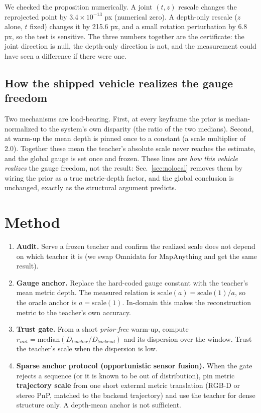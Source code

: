 We checked the proposition numerically. A joint $(t,z)$ rescale changes the
reprojected point by $3.4\times10^{-13}$ px (numerical zero). A depth-only rescale
($z$ alone, $t$ fixed) changes it by 215.6 px, and a small rotation perturbation
by 6.8 px, so the test is sensitive. The three numbers together are the
certificate: the joint direction is null, the depth-only direction is not, and
the measurement could have seen a difference if there were one.

\subsection{How the shipped vehicle realizes the gauge freedom}

Two mechanisms are load-bearing. First, at every keyframe the prior is
median-normalized to the system's own disparity (the ratio of the two medians).
Second, at warm-up the mean depth is pinned once to a constant (a scale
multiplier of 2.0). Together these mean the teacher's absolute scale never reaches the estimate, and
the global gauge is set once and frozen. These lines are \emph{how this vehicle
realizes} the gauge freedom, not the result: Sec.~\ref{sec:nolocal} removes them by wiring the
prior as a true metric-depth factor, and the global conclusion is unchanged,
exactly as the structural argument predicts.

\section{Method}

\begin{enumerate}
\item \textbf{Audit.} Serve a frozen teacher and confirm the realized scale does
  not depend on which teacher it is (we swap Omnidata for MapAnything and get the
  same result).
\item \textbf{Gauge anchor.} Replace the hard-coded gauge constant with the
  teacher's mean metric depth. The measured relation is
  $\mathrm{scale}(a)=\mathrm{scale}(1)/a$, so the oracle anchor is
  $a=\mathrm{scale}(1)$. In-domain this makes the reconstruction metric to the
  teacher's own accuracy.
\item \textbf{Trust gate.} From a short \emph{prior-free} warm-up, compute
  $r_{init}=\mathrm{median}(D_{teacher}/D_{backend})$ and its dispersion over the
  window. Trust the teacher's scale when the dispersion is low.
\item \textbf{Sparse anchor protocol (opportunistic sensor fusion).} When the
  gate rejects a sequence (or it is known to be out of distribution), pin metric
  \textbf{trajectory scale} from one short external metric translation (RGB-D or
  stereo PnP, matched to the backend trajectory) and use the teacher for dense
  structure only. A depth-mean anchor is not sufficient.
\end{enumerate}

